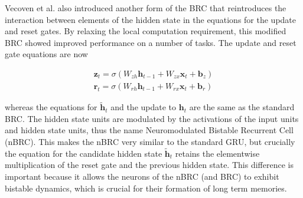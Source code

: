 Vecoven et al. \cite{vecoven2021brc} also introduced another form of the BRC that reintroduces the interaction between elements of the hidden state in the equations for the update and reset gates. By relaxing the local computation requirement, this modified BRC showed improved performance on a number of tasks. The update and reset gate equations are now

\begin{gather*}
	\mathbf{z}_t = \sigma(W_{zh} \mathbf{h}_{t-1} + W_{zx} \mathbf{x}_t + \mathbf{b}_z)\\
	\mathbf{r}_t = \sigma(W_{rh} \mathbf{h}_{t-1} + W_{rx} \mathbf{x}_t + \mathbf{b}_r)
\end{gather*}

whereas the equations for \(\mathbf{\tilde{h}}_t\) and the update to \(\mathbf{h}_t\) are the same as the standard BRC. The hidden state units are modulated by the activations of the input units and hidden state units, thus the name Neuromodulated Bistable Recurrent Cell (nBRC). This makes the nBRC very similar to the standard GRU, but crucially the equation for the candidate hidden state \(\mathbf{\tilde{h}}_t\) retains the elementwise multiplication of the reset gate and the previous hidden state. This difference is important because it allows the neurons of the nBRC (and BRC) to exhibit bistable dynamics\cite{vecoven2021brc}, which is crucial for their formation of long term memories.
